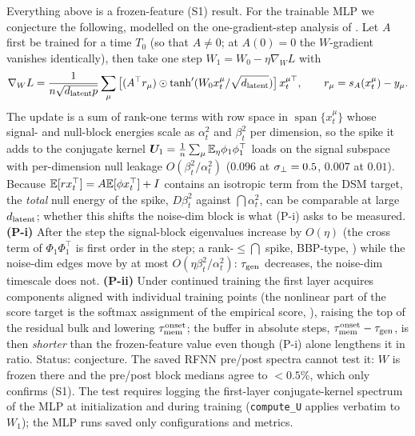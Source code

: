 \begin{remark}\label{rem:scope-feature}
Everything above is a frozen-feature (S1) result. For the trainable MLP we conjecture the following, modelled on the one-gradient-step analysis of \citet{ba2022highdimensional}. Let $A$ first be trained for a time $T_0$ (so that $A\neq0$; at $A(0)=0$ the $W$-gradient vanishes identically), then take one step $W_1=W_0-\eta\nabla_WL$ with
$$\nabla_WL=\frac{1}{n\sqrt{d_{\mathrm{latent}}p}}\sum_\mu\big[(A^\top r_\mu)\odot\tanh'(W_0x^\mu_t/\sqrt{d_{\mathrm{latent}}})\big]\,x_t^{\mu\top},\qquad r_\mu=s_A(x^\mu_t)-y_\mu .$$
The update is a sum of rank-one terms with row space in $\operatorname{span}\{x^\mu_t\}$ whose signal- and null-block energies scale as $\alpha_t^2$ and $\beta_t^2$ per dimension, so the spike it adds to the conjugate kernel $\bm{U}_1=\frac1{n}\sum_\mu\mathbb{E}_\eta\phi_1\phi_1^\top$ loads on the signal subspace with per-dimension null leakage $O(\beta_t^2/\alpha_t^2)$ ($0.096$ at $\sigma_{\perp}=0.5$, $0.007$ at $0.01$). Because $\mathbb{E}[rx_t^\top]=A\mathbb{E}[\phi x_t^\top]+I$ contains an isotropic term from the DSM target, the \emph{total} null energy of the spike, $D\beta_t^2$ against $\dint\alpha_t^2$, can be comparable at large $d_{\mathrm{latent}}$; whether this shifts the noise-dim block is what (P-i) asks to be measured.
\textbf{(P-i)} After the step the signal-block eigenvalues increase by $O(\eta)$ (the cross term of $\Phi_1\Phi_1^\top$ is first order in the step; a rank-$\le\dint$ spike, BBP-type, \citealp{baik2005phase}) while the noise-dim edges move by at most $O(\eta\beta_t^2/\alpha_t^2)$: $\tau_{\mathrm{gen}}$ decreases, the noise-dim timescale does not.
\textbf{(P-ii)} Under continued training the first layer acquires components aligned with individual training points (the nonlinear part of the score target is the softmax assignment of the empirical score, \citealp{biroli2024dynamical,scarvelis2023closedform}), raising the top of the residual bulk and lowering $\tau_{\mathrm{mem}}^{\rm onset}$; the buffer in absolute steps, $\tau_{\mathrm{mem}}^{\rm onset}-\tau_{\mathrm{gen}}$, is then \emph{shorter} than the frozen-feature value even though (P-i) alone lengthens it in ratio.
Status: conjecture. The saved RFNN pre/post spectra cannot test it: $W$ is frozen there and the pre/post block medians agree to $<0.5\%$, which only confirms (S1). The test requires logging the first-layer conjugate-kernel spectrum of the MLP at initialization and during training (\texttt{compute\_U} applies verbatim to $W_1$); the MLP runs saved only configurations and metrics.
\end{remark}

